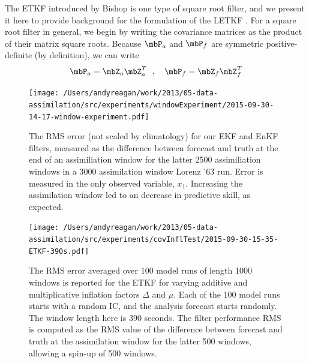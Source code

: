 The ETKF introduced by Bishop is one type of square root filter, and we present it here to provide background for the formulation of the LETKF \cite{bishop2001adaptive}.
For a square root filter in general, we begin by writing the covariance matrices as the product of their matrix square roots.
Because $\mbP_a$ and $\mbP_f$ are symmetric positive-definite (by definition), we can write
\begin{equation} \mbP_a = \mbZ_a \mbZ_a^T ~~,~~~ \mbP_f = \mbZ_f \mbZ_f^T \end{equation}

\begin{figure}[t]
  \centering
  \texttt{[image: /Users/andyreagan/work/2013/05-data-assimilation/src/experiments/windowExperiment/2015-09-30-14-17-window-experiment.pdf]}
  \caption[The RMS error is reported for our EKF and EnKF filters]{
    The RMS error (not scaled by climatology) for our EKF and EnKF filters, measured as the difference between forecast and truth at the end of an assimiliation window for the latter 2500 assimiliation windows in a 3000 assimilation window Lorenz '63 run.
    Error is measured in the only observed variable, $x_1$.
    Increasing the assimilation window led to an decrease in predictive skill, as expected.
  }
  \label{fig:window_test}
\end{figure}

\begin{figure}[t]
  \centering
  \texttt{[image: /Users/andyreagan/work/2013/05-data-assimilation/src/experiments/covInflTest/2015-09-30-15-35-ETKF-390s.pdf]}
  \caption[The RMS error averaged over 100 model runs of length 1000 windows is reported for the ETKF for varying additive and multiplicative inflation factors]{
    The RMS error averaged over 100 model runs of length 1000 windows is reported for the ETKF for varying additive and multiplicative inflation factors $\Delta$ and $\mu$.
    Each of the 100 model runs starts with a random IC, and the analysis forecast starts randomly.
    The window length here is 390 seconds.
    The filter performance RMS is computed as the RMS value of the difference between forecast and truth at the assimilation window for the latter 500 windows, allowing a spin-up of 500 windows.
  }
  \label{fig:ETKF_cov_tuning_390s}
\end{figure}

